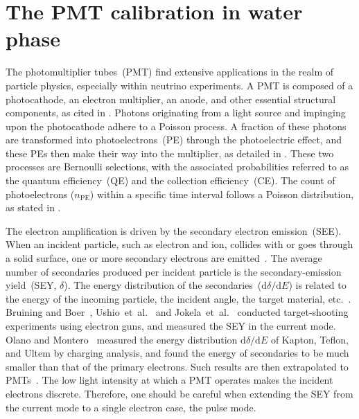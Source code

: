 \chapter{The PMT calibration in water phase}\label{sec:Introduction}
The photomultiplier tubes~(PMT) find extensive applications in the realm of particle physics, especially within neutrino experiments. A PMT is composed of a photocathode, an electron multiplier, an anode, and other essential structural components, as cited in \cite{1955Scintillation}. Photons originating from a light source and impinging upon the photocathode adhere to a Poisson process. A fraction of these photons are transformed into photoelectrons~(PE) through the photoelectric effect, and these PEs then make their way into the multiplier, as detailed in \cite{2016Optimization}. These two processes are Bernoulli selections, with the associated probabilities referred to as the quantum efficiency~(QE) and the collection efficiency~(CE). The count of photoelectrons ($n_{\mathrm{PE}}$) within a specific time interval follows a Poisson distribution, as stated in \cite{1994Absolute}.

The electron amplification is driven by the secondary electron emission~(SEE).
When an incident particle, such as electron and ion, collides with or goes through a solid surface, one or more secondary electrons are emitted~\cite{2016Secondary}.
The average number of secondaries produced per incident particle is the secondary-emission yield~(SEY, $\delta$).
The energy distribution of the secondaries~(\(\mathrm{d}\delta/\mathrm{d}E\)) is related to the energy of the incoming particle,
the incident angle, the target material, etc.~\cite{2002Probabilistic}.
Bruining and Boer~\cite{1938Secondary}, Ushio~et~al.~\cite{1988Secondary} and Jokela~et~al.~\cite{2012Secondary}
conducted target-shooting experiments using electron guns,
and measured the SEY in the current mode.
Olano and Montero~\cite{OLANO2020103456} measured the energy distribution \(\mathrm{d}\delta/\mathrm{d}E\) of Kapton, Teflon, and Ultem by charging analysis,
and found the energy of secondaries to be much smaller than that of the primary electrons.
Such results are then extrapolated to PMTs~\cite{2012An,2021Effects}.
The low light intensity at which a PMT operates makes the incident electrons discrete.
Therefore, one should be careful when extending the SEY from the current mode to a single electron case, the pulse mode.

